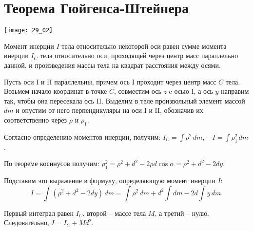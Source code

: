 \section{Теорема Гюйгенса-Штейнера}
\begin{minipage}{.38\textwidth}
    \texttt{[image: 29\_02]}
\end{minipage} \hfill
\begin{minipage}{.57\textwidth}
    Момент инерции \( I \) тела относительно некоторой оси равен сумме момента
    инерции \( I_C \) тела относительно оси, проходящей через центр масс
    параллельно данной, и произведения массы тела на квадрат расстояния между
    осями.

    Пусть оси I и II параллельны, причем ось I проходит через центр масс \( C \)
    тела. Возьмем начало координат в точке \( C \), совместим ось \( z \) c осью
    I, а ось \( y \) направим так, чтобы она пересекала ось II. Выделим в теле
    произвольный элемент массой \( dm \) и опустим от него перпендикуляры на оси
    I и II, обозначив их соответственно через \( \rho \) и \( \rho_1 \).
\end{minipage}
Согласно определению моментов инерции, получим: \( I_C = \int \rho^2\,dm, \quad
I = \int \rho_1^2\,dm \).

По теореме косинусов получим: \( \rho_1^2 = \rho^2 + d^2 - 2\rho d\cos\alpha =
\rho^2 + d^2 - 2dy \).

Подставим это выражение в формулу, определяющую момент инерции \( I \):
\[
    I = \int (\rho^2 + d^2 - 2dy)\,dm = \int \rho^2\,dm + d^2\int dm -
    2d\int y\,dm.
\]

Первый интеграл равен \( I_C \), второй -- массе тела \( M \), а третий -- нулю.
Следовательно, \( I = I_C + Md^2 \).                                             


\newpage
